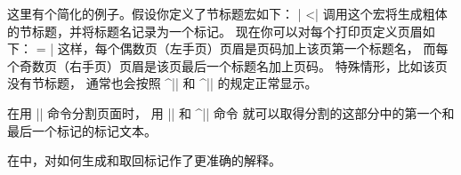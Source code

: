 {{{{{%
这里有个简化的例子。假设你定义了节标题宏如下：
\csdisplay
\def\section#1{\medskip{\bf#1}\smallskip\mark{#1}}
|
^^|\mark|
调用这个宏将生成粗体的节标题，并将标题名记录为一个标记。
现在你可以对每个打印页定义页眉如下：
\csdisplay
\headline = {\ifodd\pageno \hfil\botmark\quad\folio
   \else \folio\quad\firstmark\hfil \fi}
|
这样，每个偶数页（左手页）页眉是页码加上该页第一个标题名，
而每个奇数页（右手页）页眉是该页最后一个标题名加上页码。
特殊情形，比如该页没有节标题，
通常也会按照 ^|\firstmark| 和 ^|\botmark| 的规定正常显示。

在用 |\vsplit| 命令\ctsref{\vsplit}分割页面时，
用 |\splitfirstmark| 和 ^|\splitbotmark| 命令\ctsref{\splitfirstmark}%
就可以取得分割的这部分中的第一个和最后一个标记的标记文本。

在中，对如何生成和取回标记作了更准确的解释。
\endconcept


}}}}}
